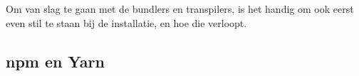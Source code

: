 \chapter{}
\label{ch:stand-van-zaken}







Om van slag te gaan met de bundlers en transpilers, is het handig om ook eerst even stil te staan bij de installatie, en hoe die verloopt.


\section{npm en Yarn}

